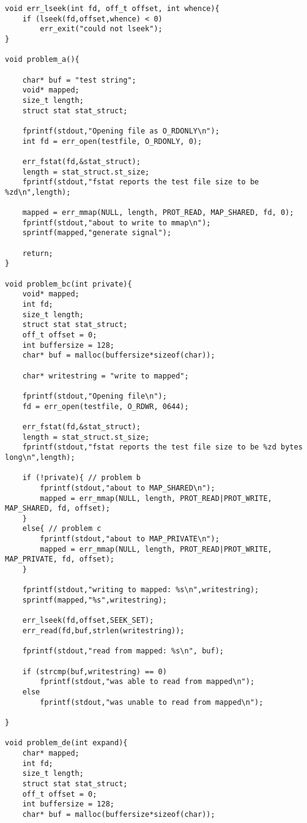 \documentclass[12pt]{article}
\begin{document}
\begin{lstlisting}
void err_lseek(int fd, off_t offset, int whence){
    if (lseek(fd,offset,whence) < 0)
        err_exit("could not lseek");
}

void problem_a(){

    char* buf = "test string";
    void* mapped;
    size_t length;
    struct stat stat_struct;

    fprintf(stdout,"Opening file as O_RDONLY\n");
    int fd = err_open(testfile, O_RDONLY, 0);

    err_fstat(fd,&stat_struct);
    length = stat_struct.st_size;
    fprintf(stdout,"fstat reports the test file size to be %zd\n",length);

    mapped = err_mmap(NULL, length, PROT_READ, MAP_SHARED, fd, 0);
    fprintf(stdout,"about to write to mmap\n");
    sprintf(mapped,"generate signal");

    return;
}

void problem_bc(int private){
    void* mapped;
    int fd;
    size_t length;
    struct stat stat_struct;
    off_t offset = 0;
    int buffersize = 128;
    char* buf = malloc(buffersize*sizeof(char));

    char* writestring = "write to mapped";

    fprintf(stdout,"Opening file\n");
    fd = err_open(testfile, O_RDWR, 0644);

    err_fstat(fd,&stat_struct);
    length = stat_struct.st_size;
    fprintf(stdout,"fstat reports the test file size to be %zd bytes long\n",length);

    if (!private){ // problem b
        fprintf(stdout,"about to MAP_SHARED\n");
        mapped = err_mmap(NULL, length, PROT_READ|PROT_WRITE, MAP_SHARED, fd, offset);
    }
    else{ // problem c
        fprintf(stdout,"about to MAP_PRIVATE\n");
        mapped = err_mmap(NULL, length, PROT_READ|PROT_WRITE, MAP_PRIVATE, fd, offset);
    }

    fprintf(stdout,"writing to mapped: %s\n",writestring);
    sprintf(mapped,"%s",writestring);

    err_lseek(fd,offset,SEEK_SET);
    err_read(fd,buf,strlen(writestring));

    fprintf(stdout,"read from mapped: %s\n", buf);

    if (strcmp(buf,writestring) == 0)
        fprintf(stdout,"was able to read from mapped\n");
    else
        fprintf(stdout,"was unable to read from mapped\n");

}

void problem_de(int expand){
    char* mapped;
    int fd;
    size_t length;
    struct stat stat_struct;
    off_t offset = 0;
    int buffersize = 128;
    char* buf = malloc(buffersize*sizeof(char));


\end{lstlisting}
\end{document}

